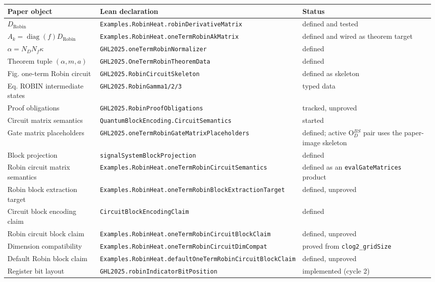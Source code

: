 \begin{center}
\begin{tabular}{lll}
\hline
Paper object & Lean declaration & Status \\
\hline
\(D_{\mathrm{Robin}}\) &
\texttt{Examples.RobinHeat.robinDerivativeMatrix} &
defined and tested \\
\(A_k=\operatorname{diag}(f)D_{\mathrm{Robin}}\) &
\texttt{Examples.RobinHeat.oneTermRobinAkMatrix} &
defined and wired as theorem target \\
\(\alpha=N_DN_f\kappa\) &
\texttt{GHL2025.oneTermRobinNormalizer} &
defined \\
Theorem tuple \((\alpha,m,a)\) &
\texttt{GHL2025.OneTermRobinTheoremData} &
defined \\
Fig. one-term Robin circuit &
\texttt{GHL2025.RobinCircuitSkeleton} &
defined as skeleton \\
Eq. ROBIN intermediate states &
\texttt{GHL2025.RobinGamma1/2/3} &
typed data \\
Proof obligations &
\texttt{GHL2025.RobinProofObligations} &
tracked, unproved \\
Circuit matrix semantics &
\texttt{QuantumBlockEncoding.CircuitSemantics} &
started \\
Gate matrix placeholders &
\texttt{GHL2025.oneTermRobinGateMatrixPlaceholders} &
defined; active O$_D^{BS}$ pair uses the paper-image skeleton \\
Block projection &
\texttt{signalSystemBlockProjection} &
defined \\
Robin circuit matrix semantics &
\texttt{Examples.RobinHeat.oneTermRobinCircuitSemantics} &
defined as an \texttt{evalGateMatrices} product \\
Robin block extraction target &
\texttt{Examples.RobinHeat.oneTermRobinBlockExtractionTarget} &
defined, unproved \\
Circuit block encoding claim &
\texttt{CircuitBlockEncodingClaim} &
defined \\
Robin circuit block claim &
\texttt{Examples.RobinHeat.oneTermRobinCircuitBlockClaim} &
defined, unproved \\
Dimension compatibility &
\texttt{Examples.RobinHeat.oneTermRobinCircuitDimCompat} &
proved from \texttt{clog2\_gridSize} \\
Default Robin block claim &
\texttt{Examples.RobinHeat.defaultOneTermRobinCircuitBlockClaim} &
defined, unproved \\
Register bit layout &
\texttt{GHL2025.robinIndicatorBitPosition} &
implemented (cycle 2) \\

\end{tabular}
\end{center}

